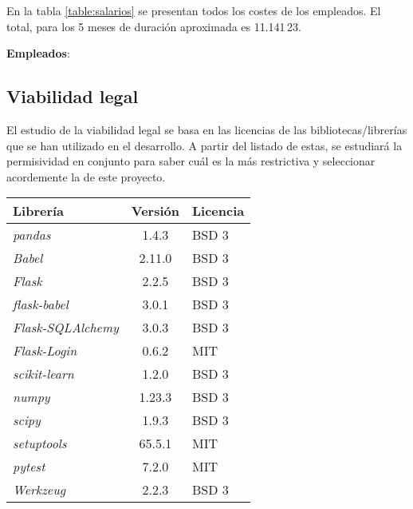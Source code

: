 En la tabla \ref{table:salarios} se presentan todos los costes de los empleados.
El total, para los 5 meses de duración aproximada es 11.141\,23\texteuro.

\textbf{Empleados}:\\
\subsection{Viabilidad legal}

El estudio de la viabilidad legal se basa en las licencias de las
bibliotecas/librerías que se han utilizado en el desarrollo. A partir del
listado de estas, se estudiará la permisividad en conjunto para saber cuál es la
más restrictiva y seleccionar acordemente la de este proyecto.

\begin{table}[h!]
    \centering
    \begin{tabular}{lcl}
    \toprule
    \textbf{Librería}         & \textbf{Versión} & \textbf{Licencia}                        \\ \midrule
    \textit{pandas}           & 1.4.3            & BSD 3                                    \\
    \textit{Babel}            & 2.11.0           & BSD 3                                    \\
    \textit{Flask}            & 2.2.5            & BSD 3                                    \\
    \textit{flask-babel}      & 3.0.1            & BSD 3                                    \\
    \textit{Flask-SQLAlchemy} & 3.0.3            & BSD 3                                    \\
    \textit{Flask-Login}      & 0.6.2            & MIT                                      \\
    \textit{scikit-learn}     & 1.2.0            & BSD 3                                    \\
    \textit{numpy}            & 1.23.3           & BSD 3                                    \\
    \textit{scipy}            & 1.9.3            & BSD 3                                    \\
    \textit{setuptools}       & 65.5.1           & MIT                                      \\
    \textit{pytest}           & 7.2.0            & MIT                                      \\
    \textit{Werkzeug}         & 2.2.3            & BSD 3                                    \\

\end{tabular}
\end{table}
